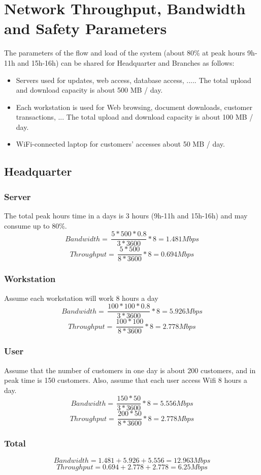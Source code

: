 \section{Network Throughput, Bandwidth and Safety Parameters}
The parameters of the flow and load of the system (about 80\% at peak hours 9h-11h and 15h-16h) can be shared for Headquarter and Branches as follows:
\begin{itemize}
    \item Servers used for updates, web access, database access, ..... The total upload and download capacity is about 500 MB / day.
\item Each workstation is used for Web browsing, document downloads, customer transactions, ... The total upload and download capacity is about 100 MB / day.
\item WiFi-connected laptop for customers’ accesses about 50 MB / day.
\end{itemize}

\subsection{Headquarter}
\subsubsection{Server}
The total peak hours time in a days is 3 hours (9h-11h and 15h-16h) and may consume up to 80\%. \\
$$Bandwidth = \, \frac{5*500*0.8}{3*3600}*8 = 1.481Mbps$$
$$Throughput = \, \frac{5*500}{8*3600}*8 = 0.694Mbps$$
\subsubsection{Workstation}
Assume each workstation will work 8 hours a day
$$Bandwidth = \, \frac{100*100*0.8}{3*3600}*8 = 5.926Mbps$$
$$Throughput = \, \frac{100*100}{8*3600}*8 = 2.778Mbps$$
\subsubsection{User}
Assume that the number of customers in one day is about 200 customers, and in peak
time is 150 customers. Also, assume that each user access Wifi 8 hours a day.
$$Bandwidth = \, \frac{150*50}{3*3600}*8 = 5.556Mbps$$
$$Throughput = \, \frac{200*50}{8*3600}*8 = 2.778Mbps$$

\subsubsection{Total}
$$Bandwidth = 1.481+5.926+5.556 = 12.963Mbps$$
$$Throughput = 0.694+2.778+2.778 = 6.25Mbps$$


